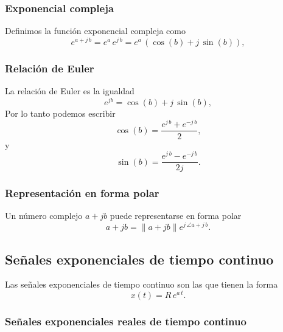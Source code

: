 \subsubsection{Exponencial compleja}

Definimos la funci\'{o}n exponencial compleja como
\begin{equation}
  e^{a + j \, b} = e^{a} \, e^{j \, b} = e^{a} \, \left( \cos (b) + j \, \sin (b) \right),
\end{equation}

\subsubsection{Relaci\'{o}n de Euler}

La relaci\'{o}n de Euler es la igualdad
\begin{equation}
  e^{j b} =  \cos \left( b \right) + j \, \sin\left( b \right), \label{expeuler}
\end{equation}
Por lo tanto podemos escribir
\begin{equation}
  \cos \left( b \right) = \frac{e^{j \, b}+e^{-j \, b}}{2}, \label{coseuler}
\end{equation}
y
\begin{equation}
  \sin \left( b \right) = \frac{e^{j \, b}-e^{-j \, b}}{2j}. \label{sineuler}
\end{equation}


\subsubsection{Representaci\'{o}n en forma polar}

Un n\'{u}mero complejo $a + j b$ puede representarse en forma polar
\begin{equation}
  a + j b = \| a + j b\| e^{ j \, \angle{ a + j \, b} }.
\end{equation}

\subsection{Se\~{n}ales exponenciales de tiempo continuo}

Las se\~{n}ales exponenciales de tiempo continuo son las que tienen la
forma
\begin{equation}
  x(t)=R \, e^{a \, t}.
\end{equation}

\subsubsection{Se\~{n}ales exponenciales reales de tiempo continuo}

